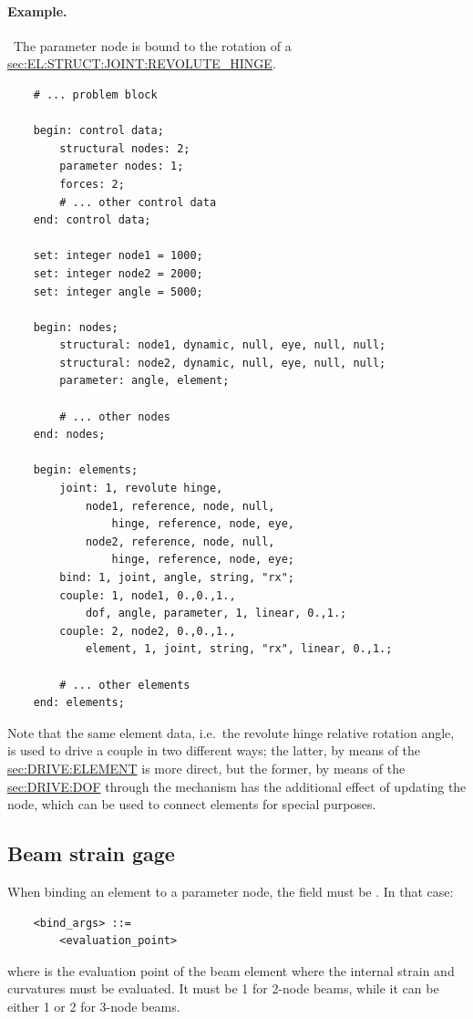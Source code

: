 \paragraph{Example.} \
The parameter node  is bound to the rotation of a 
\hyperref{\kw{revolute hinge}}{\kw{revolute hinge} (see Section~}{)}{sec:EL:STRUCT:JOINT:REVOLUTE_HINGE}.
\begin{verbatim}
    # ... problem block

    begin: control data;
        structural nodes: 2;
        parameter nodes: 1;
        forces: 2;
        # ... other control data
    end: control data;

    set: integer node1 = 1000;
    set: integer node2 = 2000;
    set: integer angle = 5000;

    begin: nodes;
        structural: node1, dynamic, null, eye, null, null;
        structural: node2, dynamic, null, eye, null, null;
        parameter: angle, element;

        # ... other nodes
    end: nodes;

    begin: elements;
        joint: 1, revolute hinge,
            node1, reference, node, null,
                hinge, reference, node, eye,
            node2, reference, node, null,
                hinge, reference, node, eye;
        bind: 1, joint, angle, string, "rx";
        couple: 1, node1, 0.,0.,1.,
            dof, angle, parameter, 1, linear, 0.,1.;
        couple: 2, node2, 0.,0.,1.,
            element, 1, joint, string, "rx", linear, 0.,1.;

        # ... other elements
    end: elements;
\end{verbatim}
Note that the same element data, i.e.\ the revolute hinge
relative rotation angle, is used to drive a couple in two different
ways; the latter, by means of the 
\hyperref{\kw{element} drive}{\kw{element} drive (see Section~}{)}{sec:DRIVE:ELEMENT}
is more direct, but the former, by means of the 
\hyperref{\kw{dof} drive}{\kw{dof} drive (see Section~}{)}{sec:DRIVE:DOF}
through the \kw{bind} mechanism has the additional effect of updating
the \kw{parameter} node, which can be used to connect
 elements for special purposes.

\subsection{Beam strain gage}
When binding an element to a
parameter node, the \kw{element\_type} field must be \kw{beam}.
In that case:
\begin{verbatim}
    <bind_args> ::=
        <evaluation_point>
\end{verbatim}
where  is the evaluation point of the beam element
where the internal strain and curvatures must be evaluated.
It must be 1 for 2-node beams, while it can be either 1 or 2
for 3-node beams.

